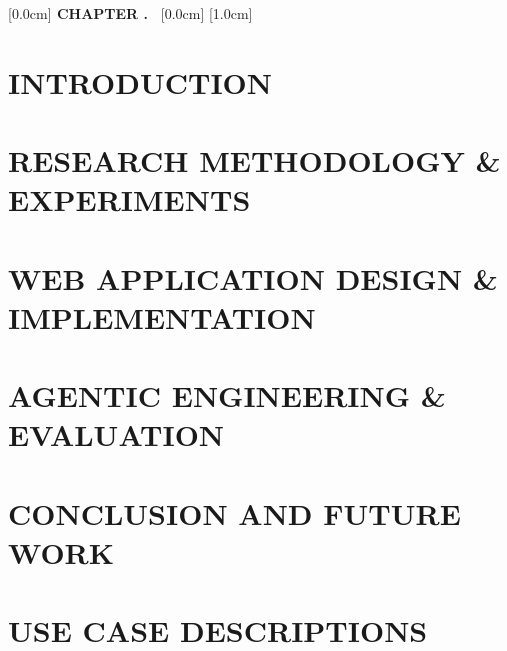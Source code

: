 \documentclass[a4paper,12pt,twoside]{report}
\renewcommand{\contentsname}{TABLE OF CONTENTS}%
\renewcommand{\listfigurename}{LIST OF FIGURES}%
\renewcommand{\listtablename}{LIST OF TABLES}%
\renewcommand{\acronymname}{LIST OF ABBREVIATIONS}%
\begin{document}
\hypersetup{pageanchor=false}

\hypersetup{pageanchor=true}

\setcounter{page}{0}
\newpage

\newpage


\newpage
\renewcommand*\contentsname{TABLE OF CONTENTS}
[0.0cm]{\bfseries\vspace{0.3cm}}{{\bfseries{\scshape} CHAPTER \thecontentslabel.\ }}{}{\contentspage}
[0.0cm]{\vspace{0.3cm}}{}{}{\contentspage}
[1.0cm]{\vspace{0.3cm}}{\thecontentslabel\ }{}{\contentspage}

\tableofcontents 
\thispagestyle{empty}
\cleardoublepage

\renewcommand{\listfigurename}{LIST OF FIGURES}
\bgroup\hfuzz=20pt
{\let\oldnumberline\numberline \renewcommand{\numberline}{Figure~\oldnumberline} \listoffigures}
\egroup 
\newpage

\renewcommand{\listtablename}{LIST OF TABLES}
{\let\oldnumberline\numberline \renewcommand{\numberline}{Table~\oldnumberline} \listoftables}
\newpage

\glsaddall 
\renewcommand*{\acronymname}{LIST OF ABBREVIATIONS}
\printnoidxglossary[type=main]
\printnoidxglossary[type=acronym]

\newpage
{}
\pagestyle{fancy}
\fancyhf{}
\fancyhead[RE, LO]{\leftmark}
\fancyfoot[RE, LO]{\thepage}

\chapter{INTRODUCTION}


\chapter{RESEARCH METHODOLOGY \& EXPERIMENTS}


\chapter{WEB APPLICATION DESIGN \& IMPLEMENTATION}


\chapter{AGENTIC ENGINEERING \& EVALUATION}


\chapter{CONCLUSION AND FUTURE WORK}


\newpage
\printbibliography
{}

\appendixpage
\appendices
\chapter{USE CASE DESCRIPTIONS}

\end{document}
